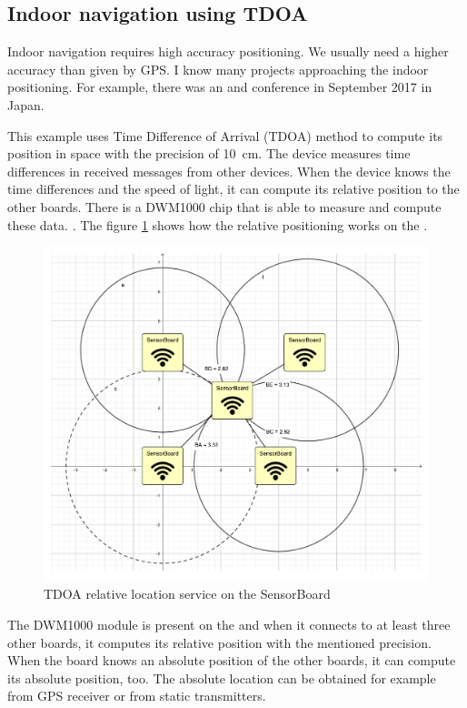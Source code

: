 \subsection{Indoor navigation using \ac{TDOA}}
Indoor navigation requires high accuracy positioning. We usually need a higher accuracy than given by GPS. I know many projects approaching the indoor positioning. For example, there was an  and  conference in September 2017 in Japan.

This example uses Time Difference of Arrival (\ac{TDOA}) method to compute its position in space with the precision of \SI{10}{cm}. The device measures time differences in received messages from other devices. When the device knows the time differences and the speed of light, it can compute its relative position to the other boards. There is a DWM1000 chip that is able to measure and compute these data. \cite{decawave:DWM1000}. The figure \ref{UETDOA} shows how the relative positioning works on the .

\begin{figure}
    \centering
    \caption{\ac{TDOA} relative location service on the SensorBoard}
    \label{UETDOA}
    \includegraphics[trim=5cm 6cm 5cm 5cm, clip, width=15cm]{img/UsageExamplesTDOA.pdf}
\end{figure}

The DWM1000 \cite{decawave:DWM1000} module is present on the  and when it connects to at least three other boards, it computes its relative position with the mentioned precision. When the board knows an absolute position of the other boards, it can compute its absolute position, too. The absolute location can be obtained for example from GPS receiver or from static transmitters.

